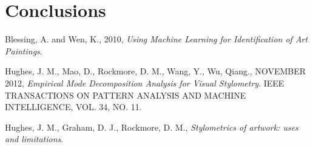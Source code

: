 \documentclass[twocolumn]{article}
\begin{document}
  \section{Conclusions}

  \begin{thebibliography}
    Blessing, A. and Wen, K.,
    2010,
    \emph{Using Machine Learning for Identification of Art Paintings}.
  
    Hughes, J. M., Mao, D., Rockmore, D. M., Wang, Y., Wu, Qiang.,
    NOVEMBER 2012,
    \emph{Empirical Mode Decomposition Analysis for Visual Stylometry}.
    IEEE TRANSACTIONS ON PATTERN ANALYSIS AND MACHINE INTELLIGENCE,
    VOL. 34,
    NO. 11.
  
    Hughes, J. M., Graham, D. J., Rockmore, D. M.,
    \emph{Stylometrics of artwork: uses and limitations}.
  
  \end{thebibliography}
\end{document}
